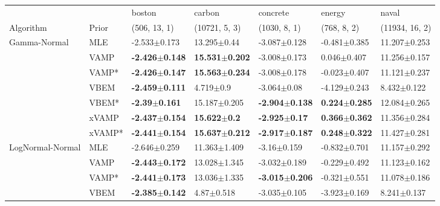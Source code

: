 \begin{tabular}{lllllll}
\toprule
       &     &                     boston &                     carbon &                   concrete &                    energy &                      naval \\
Algorithm & Prior& (506, 13, 1)& (10721, 5, 3)& (1030, 8, 1)& (768, 8, 2)& (11934, 16, 2)\\
\midrule
Gamma-Normal & MLE &           -2.533$\pm$0.173 &            13.295$\pm$0.44 &           -3.087$\pm$0.128 &          -0.481$\pm$0.385 &           11.207$\pm$0.253 \\
       & VAMP &  \textbf{-2.426$\pm$0.148} &  \textbf{15.531$\pm$0.202} &           -3.008$\pm$0.173 &           0.046$\pm$0.407 &           11.256$\pm$0.157 \\
       & VAMP* &  \textbf{-2.426$\pm$0.147} &  \textbf{15.563$\pm$0.234} &           -3.008$\pm$0.178 &          -0.023$\pm$0.407 &           11.121$\pm$0.237 \\
       & VBEM &  \textbf{-2.459$\pm$0.111} &              4.719$\pm$0.9 &            -3.064$\pm$0.08 &          -4.129$\pm$0.243 &            8.432$\pm$0.122 \\
       & VBEM* &   \textbf{-2.39$\pm$0.161} &           15.187$\pm$0.205 &  \textbf{-2.904$\pm$0.138} &  \textbf{0.224$\pm$0.285} &           12.084$\pm$0.265 \\
       & xVAMP &  \textbf{-2.437$\pm$0.154} &    \textbf{15.622$\pm$0.2} &   \textbf{-2.925$\pm$0.17} &  \textbf{0.366$\pm$0.362} &           11.356$\pm$0.284 \\
       & xVAMP* &  \textbf{-2.441$\pm$0.154} &  \textbf{15.637$\pm$0.212} &  \textbf{-2.917$\pm$0.187} &  \textbf{0.248$\pm$0.322} &           11.427$\pm$0.281 \\
LogNormal-Normal & MLE &           -2.646$\pm$0.259 &           11.363$\pm$1.409 &            -3.16$\pm$0.159 &          -0.832$\pm$0.701 &           11.157$\pm$0.292 \\
       & VAMP &  \textbf{-2.443$\pm$0.172} &           13.028$\pm$1.345 &           -3.032$\pm$0.189 &          -0.229$\pm$0.492 &           11.123$\pm$0.162 \\
       & VAMP* &  \textbf{-2.441$\pm$0.173} &           13.036$\pm$1.335 &  \textbf{-3.015$\pm$0.206} &          -0.321$\pm$0.551 &           11.078$\pm$0.186 \\
       & VBEM &  \textbf{-2.385$\pm$0.142} &             4.87$\pm$0.518 &           -3.035$\pm$0.105 &          -3.923$\pm$0.169 &            8.241$\pm$0.137 \\

\end{tabular}

